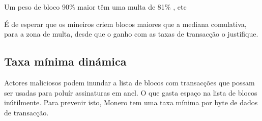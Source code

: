 \newline Um peso de bloco 90\% maior têm uma multa de 81\% , etc \cite{monero-coin-emission}


É de esperar que os mineiros criem blocos maiores que a mediana comulativa, para a zona de multa, desde que o ganho com as taxas de transacção o justifique.
 


\subsection{Taxa mínima dinámica}
\label{subsec:dynamic-minimum-fee} %

Actores maliciosos podem inundar a lista de blocos com transacções que possam ser usadas para poluír assinaturas em anel. O que gasta espaço na lista de blocos inútilmente.
\newline Para prevenir isto, Monero tem uma taxa mínima por byte de dados de transacção.

